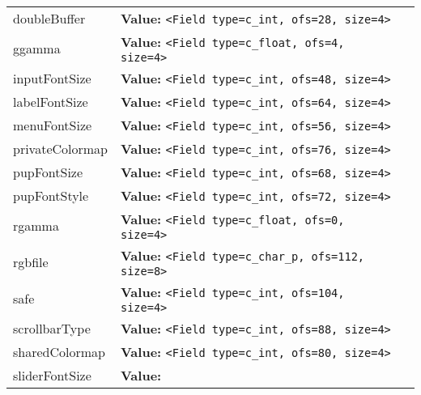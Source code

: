 \begin{longtable}{|p{\varnamewidth}|p{\vardescrwidth}|l}
\cline{1-2}
\raggedright d\-o\-u\-b\-l\-e\-B\-u\-f\-f\-e\-r\- & \raggedright \textbf{Value:} 
{\tt {\textless}Field type=c\_int, ofs=28, size=4{\textgreater}}&\\
\cline{1-2}
\raggedright g\-g\-a\-m\-m\-a\- & \raggedright \textbf{Value:} 
{\tt {\textless}Field type=c\_float, ofs=4, size=4{\textgreater}}&\\
\cline{1-2}
\raggedright i\-n\-p\-u\-t\-F\-o\-n\-t\-S\-i\-z\-e\- & \raggedright \textbf{Value:} 
{\tt {\textless}Field type=c\_int, ofs=48, size=4{\textgreater}}&\\
\cline{1-2}
\raggedright l\-a\-b\-e\-l\-F\-o\-n\-t\-S\-i\-z\-e\- & \raggedright \textbf{Value:} 
{\tt {\textless}Field type=c\_int, ofs=64, size=4{\textgreater}}&\\
\cline{1-2}
\raggedright m\-e\-n\-u\-F\-o\-n\-t\-S\-i\-z\-e\- & \raggedright \textbf{Value:} 
{\tt {\textless}Field type=c\_int, ofs=56, size=4{\textgreater}}&\\
\cline{1-2}
\raggedright p\-r\-i\-v\-a\-t\-e\-C\-o\-l\-o\-r\-m\-a\-p\- & \raggedright \textbf{Value:} 
{\tt {\textless}Field type=c\_int, ofs=76, size=4{\textgreater}}&\\
\cline{1-2}
\raggedright p\-u\-p\-F\-o\-n\-t\-S\-i\-z\-e\- & \raggedright \textbf{Value:} 
{\tt {\textless}Field type=c\_int, ofs=68, size=4{\textgreater}}&\\
\cline{1-2}
\raggedright p\-u\-p\-F\-o\-n\-t\-S\-t\-y\-l\-e\- & \raggedright \textbf{Value:} 
{\tt {\textless}Field type=c\_int, ofs=72, size=4{\textgreater}}&\\
\cline{1-2}
\raggedright r\-g\-a\-m\-m\-a\- & \raggedright \textbf{Value:} 
{\tt {\textless}Field type=c\_float, ofs=0, size=4{\textgreater}}&\\
\cline{1-2}
\raggedright r\-g\-b\-f\-i\-l\-e\- & \raggedright \textbf{Value:} 
{\tt {\textless}Field type=c\_char\_p, ofs=112, size=8{\textgreater}}&\\
\cline{1-2}
\raggedright s\-a\-f\-e\- & \raggedright \textbf{Value:} 
{\tt {\textless}Field type=c\_int, ofs=104, size=4{\textgreater}}&\\
\cline{1-2}
\raggedright s\-c\-r\-o\-l\-l\-b\-a\-r\-T\-y\-p\-e\- & \raggedright \textbf{Value:} 
{\tt {\textless}Field type=c\_int, ofs=88, size=4{\textgreater}}&\\
\cline{1-2}
\raggedright s\-h\-a\-r\-e\-d\-C\-o\-l\-o\-r\-m\-a\-p\- & \raggedright \textbf{Value:} 
{\tt {\textless}Field type=c\_int, ofs=80, size=4{\textgreater}}&\\
\cline{1-2}
\raggedright s\-l\-i\-d\-e\-r\-F\-o\-n\-t\-S\-i\-z\-e\- & \raggedright \textbf{Value:} 

\end{longtable}
